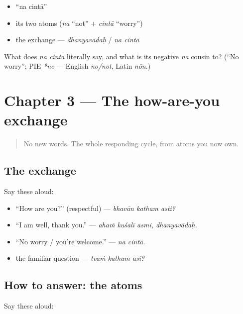 \begin{itemize}
\raggedright
  \item \textquotedblleft{}na cintā\textquotedblright{}
  \item its two atoms (\emph{na} \textquotedblleft{}not\textquotedblright{} + \emph{cintā} \textquotedblleft{}worry\textquotedblright{})
  \item the exchange — \emph{dhanyavādaḥ} / \emph{na cintā}
\end{itemize}

\begin{tcolorbox}[breakable,colback=teal!4,colframe=teal!35!black,title={Before you move on}]
What does \emph{na cintā} literally say, and what is its negative \emph{na} cousin to? (\textquotedblleft{}No worry\textquotedblright{}; PIE \emph{*ne} — English \emph{no/not}, Latin \emph{nōn}.)
\end{tcolorbox}
\section[Practice]{Chapter 3 — The how-are-you exchange}

\label{lesson:SA-C03-practice}



\begin{quote}
No new words. The whole responding cycle, from atoms you now own.
\end{quote}

\subsection*{The exchange}
Say these aloud:

\begin{itemize}
\raggedright
  \item \textquotedblleft{}How are you?\textquotedblright{} (respectful) — \emph{bhavān katham asti?}
  \item \textquotedblleft{}I am well, thank you.\textquotedblright{} — \emph{ahaṁ kuśalī asmi, dhanyavādaḥ.}
  \item \textquotedblleft{}No worry / you're welcome.\textquotedblright{} — \emph{na cintā.}
  \item the familiar question — \emph{tvaṁ katham asi?}
\end{itemize}

\subsection*{How to answer: the atoms}
Say these aloud:

